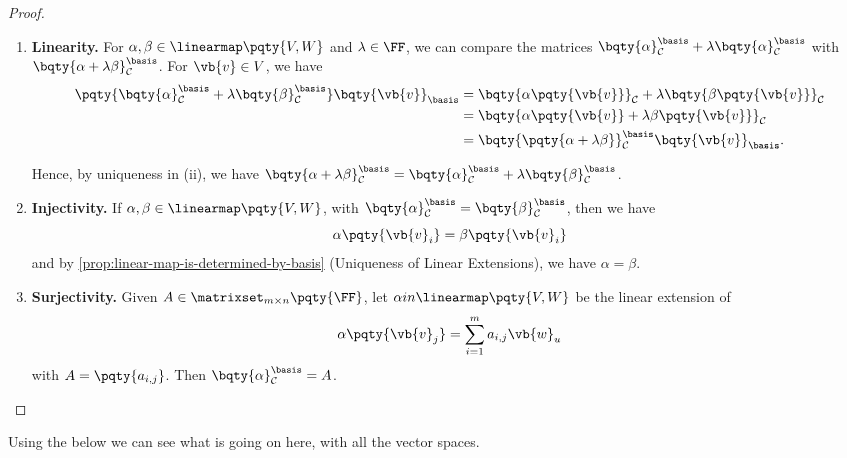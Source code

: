 \begin{proof}
\begin{enumerate}[label=(\roman*)]
        \item \textbf{Linearity.} For \(\alpha, \beta \in \linearmap\pqty{V, W}\) and \(\lambda \in \FF\), we can compare the matrices \(\bqty{\alpha}_{\mathcal{C}}^{\basis} + \lambda \bqty{\alpha}_{\mathcal{C}}^{\basis}\) with \(\bqty{\alpha + \lambda \beta}_{\mathcal{C}}^{\basis}\). For \(\vb{v} \in V\), we have
        \begin{align*}
            \pqty{\bqty{\alpha}_{\mathcal{C}}^{\basis} + \lambda \bqty{\beta}_{\mathcal{C}}^{\basis}} \bqty{\vb{v}}_{\basis} &= \bqty{\alpha \pqty{\vb{v}}}_{\mathcal{C}} + \lambda \bqty{\beta\pqty{\vb{v}}}_{\mathcal{C}} \\
            &= \bqty{\alpha \pqty{\vb{v}} + \lambda \beta \pqty{\vb{v}}}_{\mathcal{C}} \\
            &= \bqty{\pqty{\alpha + \lambda \beta}}_{\mathcal{C}}^{\basis} \bqty{\vb{v}}_{\basis}.
        \end{align*}
    
        Hence, by uniqueness in (ii), we have \(\bqty{\alpha + \lambda \beta}_{\mathcal{C}}^{\basis} = \bqty{\alpha}_{\mathcal{C}}^{\basis} + \lambda \bqty{\beta}_{\mathcal{C}}^{\basis}\).

        \item \textbf{Injectivity.} If \(\alpha, \beta \in \linearmap\pqty{V, W}\), with \(\bqty{\alpha}_{\mathcal{C}}^{\basis} = \bqty{\beta}_{\mathcal{C}}^{\basis}\), then we have
        \[  
            \alpha\pqty{\vb{v}_i} = \beta\pqty{\vb{v}_i}
        \]
        and by \autoref{prop:linear-map-is-determined-by-basis} (Uniqueness of Linear Extensions), we have \(\alpha = \beta\).

        \item \textbf{Surjectivity.} Given \(A \in \matrixset_{m \times n} \pqty{\FF}\), let \(\alpha in \linearmap\pqty{V, W}\) be the linear extension of
        \[
            \alpha\pqty{\vb{v}_j} = \sum_{i = 1}^{m} a_{i, j} \vb{w}_u
        \]
        with \(A = \pqty{a_{i, j}}\). Then \(\bqty{\alpha}_{\mathcal{C}}^{\basis} = A\).
    \end{enumerate}
\end{proof}

Using the  below we can see what is going on here, with all the vector spaces.

